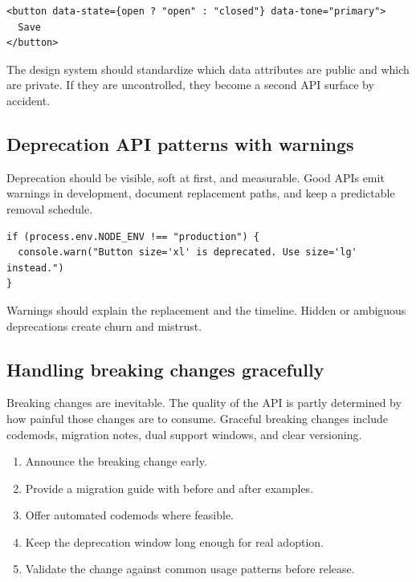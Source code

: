 \begin{verbatim}
<button data-state={open ? "open" : "closed"} data-tone="primary">
  Save
</button>
\end{verbatim}

The design system should standardize which data attributes are public and which are private. If they are uncontrolled, they become a second API surface by accident.

\subsection{Deprecation API patterns with warnings}
Deprecation should be visible, soft at first, and measurable. Good APIs emit warnings in development, document replacement paths, and keep a predictable removal schedule.

\begin{verbatim}
if (process.env.NODE_ENV !== "production") {
  console.warn("Button size='xl' is deprecated. Use size='lg' instead.")
}
\end{verbatim}

Warnings should explain the replacement and the timeline. Hidden or ambiguous deprecations create churn and mistrust.

\subsection{Handling breaking changes gracefully}
Breaking changes are inevitable. The quality of the API is partly determined by how painful those changes are to consume. Graceful breaking changes include codemods, migration notes, dual support windows, and clear versioning.

\begin{enumerate}[leftmargin=*, itemsep=0.35em]
  \item Announce the breaking change early.
  \item Provide a migration guide with before and after examples.
  \item Offer automated codemods where feasible.
  \item Keep the deprecation window long enough for real adoption.
  \item Validate the change against common usage patterns before release.
\end{enumerate}

